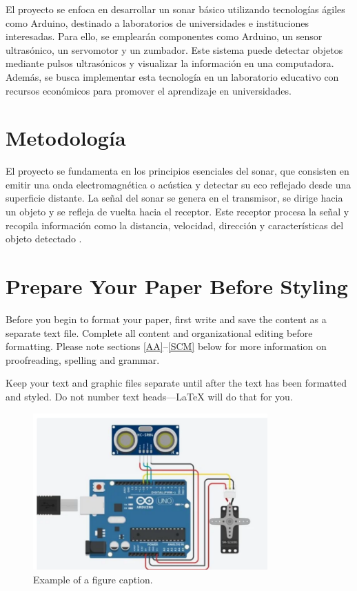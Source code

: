\documentclass[conference]{IEEEtran}
\begin{document}
El proyecto se enfoca en desarrollar un sonar básico utilizando tecnologías ágiles como Arduino, destinado a laboratorios de universidades e instituciones interesadas. Para ello, se emplearán componentes como Arduino, un sensor ultrasónico, un servomotor y un zumbador. Este sistema puede detectar objetos mediante pulsos ultrasónicos y visualizar la información en una computadora. Además, se busca implementar esta tecnología en un laboratorio educativo con recursos económicos para promover el aprendizaje en universidades.

\section{Metodología}

El proyecto se fundamenta en los principios esenciales del sonar, que consisten en emitir una onda electromagnética o acústica y detectar su eco reflejado desde una superficie distante. La señal del sonar se genera en el transmisor, se dirige hacia un objeto y se refleja de vuelta hacia el receptor. Este receptor procesa la señal y recopila información como la distancia, velocidad, dirección y características del objeto detectado \cite{rosales2017diseno, alvarez2015sistema, diaz2005modelado}.

\section{Prepare Your Paper Before Styling}
Before you begin to format your paper, first write and save the content as a 
separate text file. Complete all content and organizational editing before 
formatting. Please note sections \ref{AA}--\ref{SCM} below for more information on 
proofreading, spelling and grammar.

Keep your text and graphic files separate until after the text has been 
formatted and styled. Do not number text heads---{\LaTeX} will do that 
for you.

\begin{figure}[h!]
\centering
\includegraphics[width=9cm]{imagenes/sonar.png}
\caption{Example of a figure caption.}
\label{fig1}
\end{figure}
\end{document}
